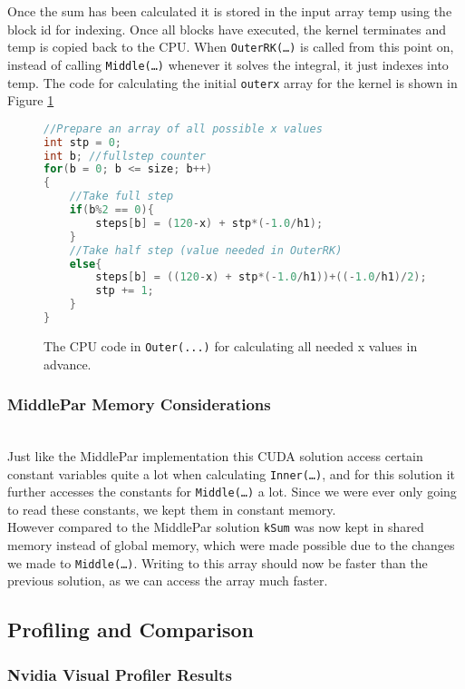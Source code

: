 Once the sum has been calculated it is stored in the input array temp using the block id for indexing. Once all blocks have executed, the kernel terminates and temp is copied back to the CPU. When \texttt{OuterRK(…)} is called from this point on, instead of calling \texttt{Middle(…)} whenever it solves the integral, it just indexes into temp. The code for calculating the initial \texttt{outerx} array for the kernel is shown in Figure \ref{fig:outerparcpu}

\begin{figure}[ht]
\begin{lstlisting}[language=c]
//Prepare an array of all possible x values
int stp = 0;
int b; //fullstep counter
for(b = 0; b <= size; b++)
{
	//Take full step
	if(b%2 == 0){
		steps[b] = (120-x) + stp*(-1.0/h1);
	}
	//Take half step (value needed in OuterRK)
	else{
		steps[b] = ((120-x) + stp*(-1.0/h1))+((-1.0/h1)/2);
		stp += 1;
	}
}
\end{lstlisting}
\caption{The CPU code in \texttt{Outer(...)} for calculating all needed x values in advance.}
\label{fig:outerparcpu}
\end{figure}

\subsubsection{MiddlePar Memory Considerations} \hfill \\
Just like the MiddlePar implementation this CUDA solution access certain constant variables quite a lot when calculating \texttt{Inner(…)}, and for this solution it further accesses the constants for \texttt{Middle(…)} a lot. Since we were ever only going to read these constants, we kept them in constant memory.\\

However compared to the MiddlePar solution \texttt{kSum} was now kept in shared memory instead of global memory, which were made possible due to the changes we made to \texttt{Middle(…)}. Writing to this array should now be faster than the previous solution, as we can access the array much faster.

\subsection{Profiling and Comparison}
\subsubsection{Nvidia Visual Profiler Results} \hfill \\
\label{sec:profiler}

